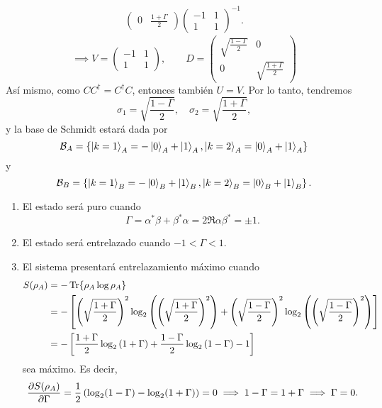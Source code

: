\documentclass{scrartcl}
\DeclareRobustCommand{\[}{\begin{equation}}
\DeclareRobustCommand{\]}{\end{equation}}
\begin{document}
\begin{enumerate}
\begin{align}
\begin{pmatrix}
            0 & \frac{1 + \Gamma}{2}
        \end{pmatrix}
        \begin{pmatrix}
            -1 & 1 \\
            1 & 1
        \end{pmatrix}^{-1}.
    \end{align}
    \[
        \implies
        V =
        \begin{pmatrix}
            -1 & 1 \\
            1 & 1
        \end{pmatrix},
        \quad \quad
        D =
        \begin{pmatrix}
            \sqrt{\frac{1-\Gamma}{2}} & 0 \\
            0 & \sqrt{\frac{1 + \Gamma}{2}}
        \end{pmatrix}
    \]
    Así mismo, como $C C^\dagger = C^\dagger C$, entonces también $U = V$. Por lo tanto, tendremos
    \[ \sigma_1 = \sqrt{\frac{1-\Gamma}{2}}, \quad \sigma_2 = \sqrt{\frac{1+\Gamma}{2}}, \]
    y la base de Schmidt estará dada por
    \[ \mathcal{B}_A = \left\{ \ket{k=1}_A = -\ket{0}_A + \ket{1}_A, \ket{k=2}_A = \ket{0}_A + \ket{1}_A \right\} \]
    y
    \[ \mathcal{B}_B = \left\{ \ket{k=1}_B = -\ket{0}_B + \ket{1}_B, \ket{k=2}_B = \ket{0}_B + \ket{1}_B \right\}. \]
    
    \begin{enumerate}
        \item El estado será puro cuando
        \[ \Gamma = \alpha^* \beta + \beta^* \alpha = 2 \Re{\alpha \beta^*} = \pm 1. \]
        \item El estado será entrelazado cuando $-1 < \Gamma < 1$.
        \item El sistema presentará entrelazamiento máximo cuando
        \begin{align}
            S(\rho_A) &= - \Tr{\rho_A \log \rho_A} \\
                &= -\left[ \qty(\sqrt{\frac{1+\Gamma}{2}})^2 \log_2\qty(\qty(\sqrt{\frac{1+\Gamma}{2}})^2) + \qty(\sqrt{\frac{1-\Gamma}{2}})^2 \log_2\qty(\qty(\sqrt{\frac{1-\Gamma}{2}})^2) \right] \\
                &= -\left[ \frac{1+\Gamma}{2} \log_2\qty(1+\Gamma) + \frac{1-\Gamma}{2} \log_2\qty(1-\Gamma) - 1 \right]
        \end{align}
        sea máximo. Es decir,
        \[ \pdv{S(\rho_A)}{\Gamma} = \frac{1}{2} \left( \log_2(1-\Gamma) - \log_2(1+\Gamma) \right) = 0 \implies 1-\Gamma = 1+\Gamma \implies \Gamma = 0. \]
    \end{enumerate}
    

\end{enumerate}
\end{document}
